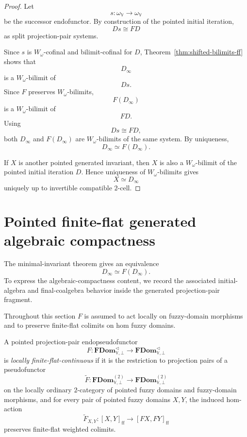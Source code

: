 \begin{proof}
Let
\[
    s:\omega_{\mathbb V}\to\omega_{\mathbb V}
\]
be the successor endofunctor.  By construction of the pointed initial
iteration,
\[
    Ds\cong FD
\]
as split projection-pair systems.

Since \(s\) is \(W_\omega\)-cofinal and bilimit-cofinal for \(D\),
Theorem~\ref{thm:shifted-bilimits-ff} shows that
\[
    D_\infty
\]
is a \(W_\omega\)-bilimit of
\[
    Ds.
\]
Since \(F\) preserves \(W_\omega\)-bilimits,
\[
    F(D_\infty)
\]
is a \(W_\omega\)-bilimit of
\[
    FD.
\]
Using
\[
    Ds\cong FD,
\]
both \(D_\infty\) and \(F(D_\infty)\) are \(W_\omega\)-bilimits of the same
system.  By uniqueness,
\[
    D_\infty\simeq F(D_\infty).
\]

If \(X\) is another pointed generated invariant, then \(X\) is also a
\(W_\omega\)-bilimit of the pointed initial iteration \(D\).  Hence uniqueness
of \(W_\omega\)-bilimits gives
\[
    X\simeq D_\infty
\]
uniquely up to invertible compatible \(2\)-cell.
\end{proof}

\section{Pointed finite-flat generated algebraic compactness}
\label{sec:pointed-ff-algebraic-compactness}

The minimal-invariant theorem gives an equivalence
\[
    D_\infty\simeq F(D_\infty).
\]
To express the algebraic-compactness content, we record the associated
initial-algebra and final-coalgebra behavior inside the generated
projection-pair fragment.

Throughout this section \(F\) is assumed to act locally on fuzzy-domain
morphisms and to preserve finite-flat colimits on hom fuzzy domains.

\begin{definition}
\label{def:locally-ff-continuous-endopseudofunctor}
A pointed projection-pair endopseudofunctor
\[
    F:
    \mathbf{FDom}^{\triangleleft}_{\mathbb V,\bot}
    \to
    \mathbf{FDom}^{\triangleleft}_{\mathbb V,\bot}
\]
is \emph{locally finite-flat-continuous} if it is the restriction to projection
pairs of a pseudofunctor
\[
    \widetilde F:
    \mathbf{FDom}^{(2)}_{\mathbb V,\bot}
    \to
    \mathbf{FDom}^{(2)}_{\mathbb V,\bot}
\]
on the locally ordinary \(2\)-category of pointed fuzzy domains and
fuzzy-domain morphisms, and for every pair of pointed fuzzy domains \(X,Y\),
the induced hom-action
\[
    \widetilde F_{X,Y}:
    [X,Y]_{\mathrm{ff}}
    \to
    [FX,FY]_{\mathrm{ff}}
\]
preserves finite-flat weighted colimits.
\end{definition}

